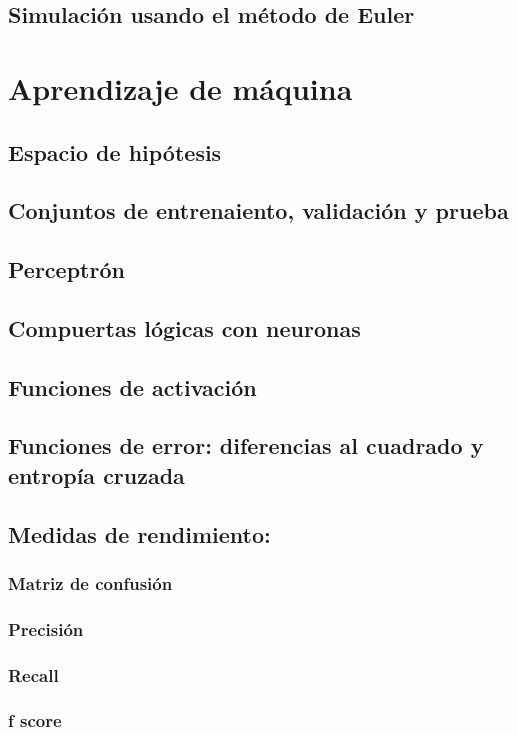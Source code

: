 \documentclass[12pt,openany]{book}
\begin{document}
\section{Simulación usando el método de Euler}

\chapter{Aprendizaje de máquina}
\section{Espacio de hipótesis}
\section{Conjuntos de entrenaiento, validación y prueba}
\section{Perceptrón}
\section{Compuertas lógicas con neuronas}
\section{Funciones de activación}
\section{Funciones de error: diferencias al cuadrado y entropía cruzada}
\section{Medidas de rendimiento:}
\subsection{Matriz de confusión}
\subsection{Precisión}
\subsection{Recall}
\subsection{f score}
\end{document}

